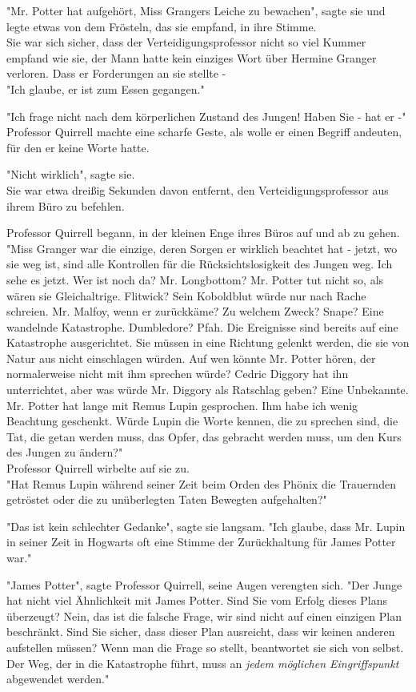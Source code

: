 {"Mr. Potter hat aufgehört, Miss Grangers Leiche zu bewachen", sagte sie und legte etwas von dem Frösteln, das sie empfand, in ihre Stimme.\\ Sie war sich sicher, dass der Verteidigungsprofessor nicht so viel Kummer empfand wie sie, der Mann hatte kein einziges Wort über Hermine Granger verloren. Dass er Forderungen an sie stellte -\\ "Ich glaube, er ist zum Essen gegangen."

"Ich frage nicht nach dem körperlichen Zustand des Jungen! Haben Sie - hat er -" Professor Quirrell machte eine scharfe Geste, als wolle er einen Begriff andeuten, für den er keine Worte hatte.

"Nicht wirklich", sagte sie.\\ Sie war etwa dreißig Sekunden davon entfernt, den Verteidigungsprofessor aus ihrem Büro zu befehlen.

Professor Quirrell begann, in der kleinen Enge ihres Büros auf und ab zu gehen. "Miss Granger war die einzige, deren Sorgen er wirklich beachtet hat - jetzt, wo sie weg ist, sind alle Kontrollen für die Rücksichtslosigkeit des Jungen weg. Ich sehe es jetzt. Wer ist noch da? Mr. Longbottom? Mr. Potter tut nicht so, als wären sie Gleichaltrige. Flitwick? Sein Koboldblut würde nur nach Rache schreien. Mr. Malfoy, wenn er zurückkäme? Zu welchem Zweck? Snape? Eine wandelnde Katastrophe. Dumbledore? Pfah. Die Ereignisse sind bereits auf eine Katastrophe ausgerichtet. Sie müssen in eine Richtung gelenkt werden, die sie von Natur aus nicht einschlagen würden. Auf wen könnte Mr. Potter hören, der normalerweise nicht mit ihm sprechen würde? Cedric Diggory hat ihn unterrichtet, aber was würde Mr. Diggory als Ratschlag geben? Eine Unbekannte. Mr. Potter hat lange mit Remus Lupin gesprochen. Ihm habe ich wenig Beachtung geschenkt. Würde Lupin die Worte kennen, die zu sprechen sind, die Tat, die getan werden muss, das Opfer, das gebracht werden muss, um den Kurs des Jungen zu ändern?"\\ Professor Quirrell wirbelte auf sie zu.\\ "Hat Remus Lupin während seiner Zeit beim Orden des Phönix die Trauernden getröstet oder die zu unüberlegten Taten Bewegten aufgehalten?"

"Das ist kein schlechter Gedanke", sagte sie langsam. "Ich glaube, dass Mr. Lupin in seiner Zeit in Hogwarts oft eine Stimme der Zurückhaltung für James Potter war."

"James Potter", sagte Professor Quirrell, seine Augen verengten sich. "Der Junge hat nicht viel Ähnlichkeit mit James Potter. Sind Sie vom Erfolg dieses Plans überzeugt? Nein, das ist die falsche Frage, wir sind nicht auf einen einzigen Plan beschränkt. Sind Sie sicher, dass dieser Plan ausreicht, dass wir keinen anderen aufstellen müssen? Wenn man die Frage so stellt, beantwortet sie sich von selbst. Der Weg, der in die Katastrophe führt, muss an \emph{jedem möglichen Eingriffspunkt} abgewendet werden."

}
